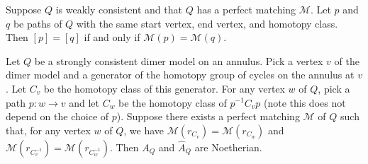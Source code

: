 \documentclass[10pt,a4paper]{amsart}
\begin{document}
\begin{prop}\label{prop:perfect-matching-intersection-num}
	Suppose $Q$ is weakly consistent and that $Q$ has a perfect matching $\mathcal M$. Let $p$ and $q$ be paths of $Q$ with the same start vertex, end vertex, and homotopy class. Then $[p]=[q]$ if and only if $\mathcal M(p)=\mathcal M(q)$.
\end{prop}

\begin{lemma}\label{lem:noeth}
	Let $Q$ be a strongly consistent dimer model on an annulus.
	Pick a vertex $v$ of the dimer model and a generator of the homotopy group of cycles on the annulus at $v$.  Let $C_v$ be the homotopy class of this generator. For any vertex $w$ of $Q$, pick a path $p:w\to v$ and let $C_w$ be the homotopy class of $p^{-1}C_vp$ (note this does not depend on the choice of $p$).
	Suppose there exists a perfect matching $\mathcal M$ of $Q$ such that, for any vertex $w$ of $Q$, we have $\mathcal M(r_{C_v})=\mathcal M(r_{C_w})$ and $\mathcal M(r_{C_v^{-1}})=\mathcal M(r_{C_w^{-1}})$. Then $A_Q$ and $\widehat A_Q$ are Noetherian.
\end{lemma}
\end{document}
